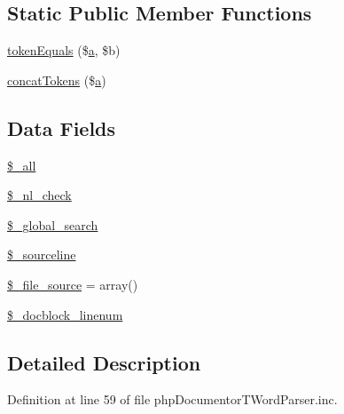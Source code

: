 \subsection*{\-Static \-Public \-Member \-Functions}
\begin{DoxyCompactItemize}
\item 
\hyperlink{classphp_documentor_t_word_parser_af25a58f1fa7a9a699d555f892c32db32}{token\-Equals} (\$\hyperlink{classa}{a}, \$b)
\item 
\hyperlink{classphp_documentor_t_word_parser_ad1a59232635f37ca2c28a7c3ca86ce05}{concat\-Tokens} (\$\hyperlink{classa}{a})
\end{DoxyCompactItemize}
\subsection*{\-Data \-Fields}
\begin{DoxyCompactItemize}
\item 
\hyperlink{classphp_documentor_t_word_parser_a5eac87273c11380d09a8b0746f8cb486}{\$\-\_\-all}
\item 
\hyperlink{classphp_documentor_t_word_parser_a38f318fc1ca497294e02a846973dedb4}{\$\-\_\-nl\-\_\-check}
\item 
\hyperlink{classphp_documentor_t_word_parser_aa6f0188167941cb67266a257b9bec056}{\$\-\_\-global\-\_\-search}
\item 
\hyperlink{classphp_documentor_t_word_parser_a36f50208ab69932b4ec10261eaf93c29}{\$\-\_\-sourceline}
\item 
\hyperlink{classphp_documentor_t_word_parser_a991f3c3abf320071ef8c5da6a3147c84}{\$\-\_\-file\-\_\-source} = array()
\item 
\hyperlink{classphp_documentor_t_word_parser_a645b04691058117cccd24e9ff582caf8}{\$\-\_\-docblock\-\_\-linenum}
\end{DoxyCompactItemize}


\subsection{\-Detailed \-Description}


\-Definition at line 59 of file php\-Documentor\-T\-Word\-Parser.\-inc.



